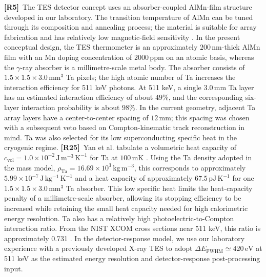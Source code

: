 \documentclass[11pt]{article}
\newcommand{\revmark}[1]{\textcolor{revisionblue}{\textbf{[R#1]}}\ }
\newcommand{\revblue}[1]{\textcolor{revisionblue}{#1}}
\begin{document}
\revmark{5}The TES detector concept uses an absorber-coupled AlMn-film structure developed
in our laboratory. The transition temperature of AlMn can be tuned through its
composition and annealing process; the material is suitable for array fabrication
and has relatively low magnetic-field sensitivity
\cite{Xie2026AlMn,Vavagiakis2017AlMnMagnetic}. In the present conceptual design,
the TES thermometer is an approximately $200\,\mathrm{nm}$-thick AlMn film with
an Mn doping concentration of $2000\,\mathrm{ppm}$ on an atomic basis, whereas the $\gamma$-ray absorber is a
millimetre-scale metal body. The absorber consists of
$1.5\times1.5\times3.0\,\mathrm{mm^3}$ Ta pixels; the high atomic number of Ta
increases the interaction efficiency for 511 keV photons. At 511 keV, a single
$3.0\,\mathrm{mm}$ Ta layer has an estimated interaction efficiency of about
$49\%$, and the corresponding six-layer interaction probability is about
$98\%$. In the
current geometry, adjacent Ta array layers have a center-to-center spacing of
$12\,\mathrm{mm}$; this spacing was chosen with a subsequent veto based on
Compton-kinematic track reconstruction in mind. Ta was also selected for its low
superconducting specific heat in the cryogenic regime. \revmark{25}\revblue{Yan et al. tabulate a
volumetric heat capacity of $c_{\mathrm{vol}}=1.0\times10^{-2}\,
\mathrm{J\,m^{-3}\,K^{-1}}$ for Ta at $100\,\mathrm{mK}$
\cite{Yan2019TaHeatCapacity}. Using the Ta density adopted in the mass model,
$\rho_{\mathrm{Ta}}=16.69\times10^{3}\,\mathrm{kg\,m^{-3}}$, this corresponds to approximately
$5.99\times10^{-7}\,\mathrm{J\,kg^{-1}\,K^{-1}}$ and a heat capacity of approximately
$67.5\,\mathrm{pJ\,K^{-1}}$ for one $1.5\times1.5\times3.0\,\mathrm{mm^3}$ Ta
absorber.} This low specific heat limits
the heat-capacity penalty of a millimetre-scale absorber, allowing its stopping
efficiency to be increased while retaining the small heat capacity needed for
high calorimetric energy resolution. Ta also has a relatively
high photoelectric-to-Compton interaction ratio. From
the NIST XCOM cross sections near 511 keV, this ratio is approximately 0.731
\cite{NISTXCOM}. In the detector-response model, we use our laboratory experience
with a previously developed X-ray TES \cite{Xie2026AlMn} to adopt
$\Delta E_{\mathrm{FWHM}}\simeq420\,\mathrm{eV}$ at 511 keV as the estimated
energy resolution and detector-response post-processing input.
\end{document}
